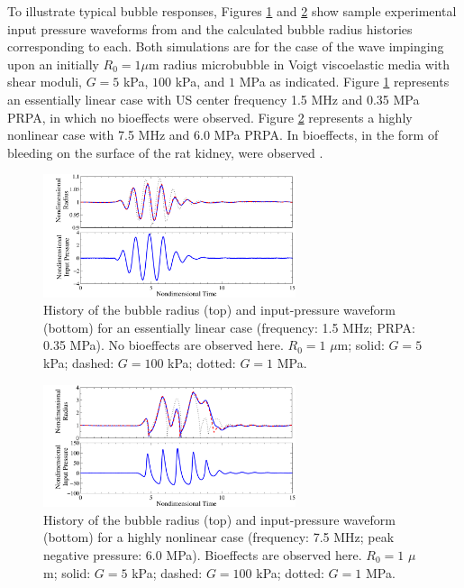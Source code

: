 To illustrate typical bubble responses, Figures
\ref{fig:sample_bubble_linear} and \ref{fig:sample_bubble_nonlinear}
show sample experimental input pressure waveforms from
\citep{Miller2008b} and the calculated bubble radius histories
corresponding to each. Both simulations are for the case of the wave
impinging upon an initially $R_0=1 \mu$m radius microbubble in Voigt
viscoelastic media with shear moduli, $G=5$ kPa, $100$ kPa, and $1$
MPa as indicated. Figure \ref{fig:sample_bubble_linear} represents an
essentially linear case with \ac{US} center frequency 1.5 MHz and 0.35
MPa \ac{PRPA}, in which no bioeffects were observed. Figure
\ref{fig:sample_bubble_nonlinear} represents a highly nonlinear case
with 7.5 MHz and 6.0 MPa \ac{PRPA}. In bioeffects, in the form of
bleeding on the surface of the rat kidney, were observed
\cite{Miller2008b}.
\begin{figure}%
  \centering
  \includegraphics[width=0.66\textwidth]{./figs/bubble_figs/rt_linear}
  \caption[Bubble radius history and input-pressure for an essentially linear case]{History of the bubble radius (top) and input-pressure
    waveform (bottom) for an essentially linear case (frequency: 1.5 MHz; \ac{PRPA}: 0.35 MPa). No bioeffects are observed
    here. $R_0=1$ $\mu$m; solid: $G=5$ kPa; dashed: $G=100$ kPa; dotted: $G=1$ MPa.}
  \label{fig:sample_bubble_linear}
\end{figure}
%
\begin{figure}%
  \centering \includegraphics[width=0.66\textwidth]{./figs/bubble_figs/rt_nonlinear}
  \caption[Bubble radius history and input-pressure for a nonlinear case]{History of the bubble radius (top) and input-pressure
    waveform (bottom) for a highly nonlinear case (frequency: 
    7.5 MHz; peak negative pressure: 6.0 MPa). Bioeffects are observed
    here. $R_0=1$ $\mu$m; solid: $G=5$ kPa; dashed: $G=100$ kPa; dotted: $G=1$ MPa.}
  \label{fig:sample_bubble_nonlinear}
\end{figure}

